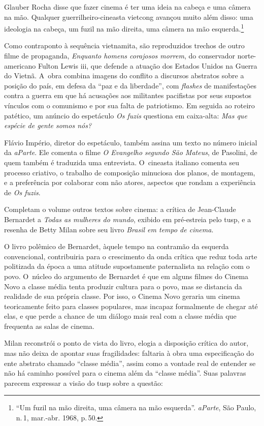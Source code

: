 {\startblockquote
Glauber Rocha disse que fazer cinema é ter uma ideia na cabeça e uma
câmera na mão. Qualquer guerrilheiro-cineasta vietcong avançou muito
além disso: uma ideologia na cabeça, um fuzil na mão direita, uma câmera
na mão esquerda.\footnote{“Um fuzil na mão direita, uma câmera na mão
  esquerda”. {\it aParte}, São Paulo, n.\,1, mar.-abr. 1968, p.\,50.}
\stopblockquote

Como contraponto à sequência vietnamita, são reproduzidos trechos de
outro filme de propaganda, {\it Enquanto homens corajosos morrem}, do
conservador norte-americano Fulton Lewis {\sc iii}, que defende a atuação dos
Estados Unidos na Guerra do Vietnã. A~obra combina imagens do conflito a
discursos abstratos sobre a posição do país, em defesa da “paz e da
liberdade”, com {\it flashes} de manifestações contra a guerra em que há
acusações aos militantes pacifistas por seus supostos vínculos com o
comunismo e por sua falta de patriotismo. Em seguida ao roteiro patético, um
anúncio do espetáculo {\it Os fuzis} questiona em caixa-alta:
{\it Mas que espécie de gente somos nós?}

Flávio Império, diretor do espetáculo, também assina um texto no
número inicial da {\it aParte}. Ele comenta o filme {\it O Evangelho
segundo São Mateus}, de Pasolini, de quem também é traduzida uma
entrevista. O~cineasta italiano comenta seu processo criativo, o
trabalho de composição minuciosa dos planos, de montagem, e a
preferência por colaborar com não atores, aspectos que rondam a
experiência de {\it Os fuzis}.

Completam o volume outros textos sobre cinema: a crítica de Jean-Claude
Bernardet a {\it Todas as mulheres do mundo}, exibido em pré-estreia
pelo {\sc tusp}, e a resenha de Betty Milan sobre seu livro {\it Brasil em tempo de cinema}.

O livro polêmico de Bernardet, àquele tempo na contramão da esquerda
convencional, contribuiria para o crescimento da onda crítica que reduz
toda arte politizada da época a uma atitude supostamente paternalista na
relação com o povo. O~núcleo do argumento de Bernardet é que em alguns
filmes do Cinema Novo a classe média tenta produzir cultura para o povo,
mas se distancia da realidade de sua própria classe. Por isso, o Cinema
Novo geraria um cinema teoricamente feito para classes
populares, mas incapaz formalmente de chegar até elas, e que perde a
chance de um diálogo mais real com a classe média que frequenta as salas
de cinema.

Milan reconstrói o ponto de vista do livro, elogia a disposição crítica
do autor, mas não deixa de apontar suas fragilidades: faltaria à obra
uma especificação do ente abstrato chamado “classe média”, assim como a
vontade real de entender se não há caminho possível para o cinema além
da “classe média”. Suas palavras parecem expressar a visão do {\sc tusp} sobre
a questão:

}
